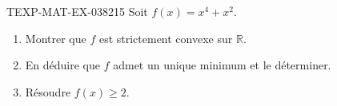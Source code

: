 \begin{exercice}{TEXP-MAT-EX-038}{2}{15}
Soit $f(x) = x^4 + x^2$.
\begin{enumerate}
  \item Montrer que $f$ est strictement convexe sur $\mathbb{R}$.
  \item En déduire que $f$ admet un unique minimum et le déterminer.
  \item Résoudre $f(x) \geq 2$.
\end{enumerate}

\end{exercice}
